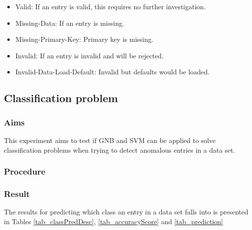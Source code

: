 \documentclass[12pt, letterpaper, titlepage]{report}
\begin{document}
\begin{itemize}
	\item Valid: If an entry is valid, this requires no further investigation. 
	\item Missing-Data: If an entry is missing.
	\item Missing-Primary-Key: Primary key is missing.
	\item Invalid: If an entry is invalid and will be rejected.
	\item Invalid-Data-Load-Default: Invalid but defaults would be loaded.
\end{itemize}

\subsection{Classification problem}

\subsubsection{Aims}
This experiment aims to test if GNB and SVM can be applied to solve classification problems when trying to detect anomalous entries in a data set.

\subsubsection{Procedure}

\subsubsection{Result} 
The results for predicting which class an entry in a data set falls into is presented in Tables \ref{tab_classPredDesc}, \ref{tab_accuracyScore} and \ref{tab_prediction}  
\end{document}
